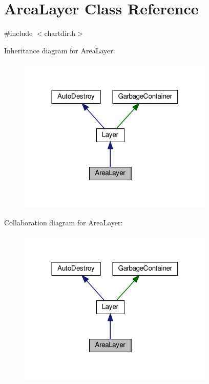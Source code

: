 \hypertarget{class_area_layer}{}\section{Area\+Layer Class Reference}
\label{class_area_layer}


{\ttfamily \#include $<$chartdir.\+h$>$}



Inheritance diagram for Area\+Layer\+:
\nopagebreak
\begin{figure}[H]
\begin{center}
\leavevmode
\includegraphics[width=264pt]{class_area_layer__inherit__graph}
\end{center}
\end{figure}


Collaboration diagram for Area\+Layer\+:
\nopagebreak
\begin{figure}[H]
\begin{center}
\leavevmode
\includegraphics[width=264pt]{class_area_layer__coll__graph}
\end{center}
\end{figure}
